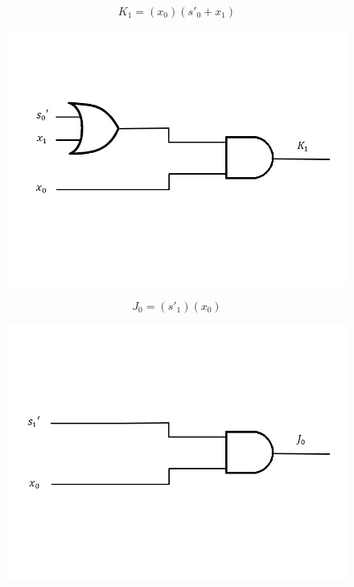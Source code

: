 \documentclass{article}
\begin{document}
\begin{equation*}
K_1 = (x_0)(s'_0 + x_1)
\end{equation*}
\begin{figure}[h!]
\centering
\includegraphics[scale=0.3]{K1}
\end{figure}

\clearpage

\begin{equation*}
J_0 = (s'_1)(x_0)
\end{equation*}
\begin{figure}[h!]
\centering
\includegraphics[scale=0.3]{J0}
\end{figure}
\end{document}
